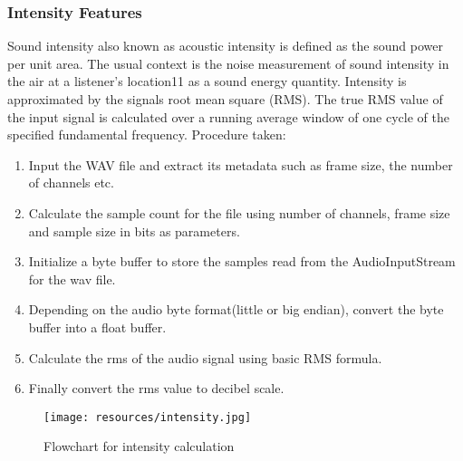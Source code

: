 \subsubsection{Intensity Features}
Sound intensity also known as acoustic intensity is defined as the sound power per unit area. The usual context is the noise measurement of sound intensity
in the air at a listener’s location11 as a sound energy quantity. Intensity is approximated by the signals root mean square (RMS). The true RMS value of the
input signal is calculated over a running average window of one cycle of the specified fundamental frequency.
Procedure taken: 
\begin{enumerate}
        \item Input the WAV file and extract its metadata such as frame size, the number of channels etc.
        \item Calculate the sample count for the file using number of channels, frame size and sample size in bits as parameters.
        \item Initialize a byte buffer to store the samples read from the AudioInputStream for the wav file.
        \item Depending on the audio byte format(little or big endian), convert the byte buffer into a float buffer.
        \item Calculate the rms of the audio signal using basic RMS formula.
        \item Finally convert the rms value to decibel scale. 
\end{enumerate}
\begin{figure}[h]
        \centering
        \texttt{[image: resources/intensity.jpg]}
        \caption{Flowchart for intensity calculation}
        \label{fig:figure6}
\end{figure}

